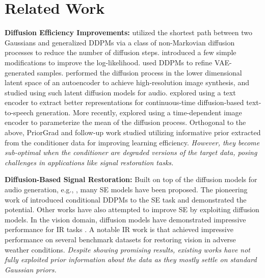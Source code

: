 \section{Related Work}

\noindent\textbf{Diffusion Efficiency Improvements:} 
\citet{das2023image} utilized the shortest path between two Gaussians and \citet{song2020denoising} generalized DDPMs via a class of non-Markovian diffusion processes to reduce the number of diffusion steps. \citet{nichol2021improved} introduced a few simple modifications to improve the log-likelihood. \citet{pandey2022diffusevae, pandey2021vaes} used DDPMs to refine VAE-generated samples. \citet{rombach2022high} performed the diffusion process in the lower dimensional latent space of an autoencoder to achieve high-resolution image synthesis, and \citet{liu2023audioldm} studied using such latent diffusion models for audio. \citet{popov2021grad} explored using a text encoder to extract better representations for continuous-time diffusion-based text-to-speech generation. More recently, \citet{nielsendiffenc} explored using a time-dependent image encoder to parameterize the mean of the diffusion process. Orthogonal to the above, PriorGrad \citep{lee2021priorgrad} and follow-up work \citep{koizumi22_interspeech} studied utilizing informative prior extracted from the conditioner data for improving learning efficiency. \textit{However, they become sub-optimal when the conditioner are degraded versions of the target data, posing challenges in applications like signal restoration tasks.}

\noindent\textbf{Diffusion-Based Signal Restoration:}
Built on top of the diffusion models for audio generation, e.g., \citet{kong2020diffwave,chen2020wavegrad,leng2022binauralgrad}, many SE models have been proposed. The pioneering work of \citet{lu2022conditional} introduced conditional DDPMs to the SE task and demonstrated the potential. Other works \citep{serra2022universal,welker2022speech,richter2023speech,yen2023cold,lemercier2023storm,tai2024dose} have also attempted to improve SE by exploiting diffusion models. In the vision domain, diffusion models have demonstrated impressive performance for IR tasks \citep{li2023diffusion,zhu2023denoising,huang2024wavedm,luo2023refusion,xia2023diffir,fei2023generative,hurault2022gradient,liu20232,chung2024direct,chungdiffusion,zhoudenoising,xiaodreamclean,zheng2024diffusion}. A notable IR work is \cite{ozdenizci2023restoring} that achieved impressive performance on several benchmark datasets for restoring vision in adverse weather conditions. \textit{Despite showing promising results, existing works have not fully exploited prior information about the data as they mostly settle on standard Gaussian priors.} 